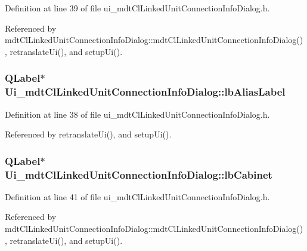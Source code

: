 Definition at line 39 of file ui\-\_\-mdt\-Cl\-Linked\-Unit\-Connection\-Info\-Dialog.\-h.



Referenced by mdt\-Cl\-Linked\-Unit\-Connection\-Info\-Dialog\-::mdt\-Cl\-Linked\-Unit\-Connection\-Info\-Dialog(), retranslate\-Ui(), and setup\-Ui().

\hypertarget{class_ui__mdt_cl_linked_unit_connection_info_dialog_a9fce06c7c6eae6eea9f0818415af2558}{
\subsubsection[{lb\-Alias\-Label}]{\setlength{\rightskip}{0pt plus 5cm}Q\-Label$\ast$ Ui\-\_\-mdt\-Cl\-Linked\-Unit\-Connection\-Info\-Dialog\-::lb\-Alias\-Label}}\label{class_ui__mdt_cl_linked_unit_connection_info_dialog_a9fce06c7c6eae6eea9f0818415af2558}


Definition at line 38 of file ui\-\_\-mdt\-Cl\-Linked\-Unit\-Connection\-Info\-Dialog.\-h.



Referenced by retranslate\-Ui(), and setup\-Ui().

\hypertarget{class_ui__mdt_cl_linked_unit_connection_info_dialog_a512b49e4632b934e43644d15e8ad218f}{
\subsubsection[{lb\-Cabinet}]{\setlength{\rightskip}{0pt plus 5cm}Q\-Label$\ast$ Ui\-\_\-mdt\-Cl\-Linked\-Unit\-Connection\-Info\-Dialog\-::lb\-Cabinet}}\label{class_ui__mdt_cl_linked_unit_connection_info_dialog_a512b49e4632b934e43644d15e8ad218f}


Definition at line 41 of file ui\-\_\-mdt\-Cl\-Linked\-Unit\-Connection\-Info\-Dialog.\-h.



Referenced by mdt\-Cl\-Linked\-Unit\-Connection\-Info\-Dialog\-::mdt\-Cl\-Linked\-Unit\-Connection\-Info\-Dialog(), retranslate\-Ui(), and setup\-Ui().

